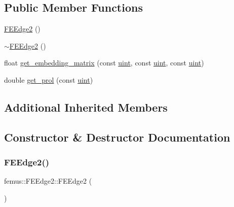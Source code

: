 \subsection*{Public Member Functions}
\begin{DoxyCompactItemize}
\item 
\mbox{\hyperlink{classfemus_1_1_f_e_edge2_a25d45b4be27432a6007312a1da20b799}{F\+E\+Edge2}} ()
\item 
\mbox{\hyperlink{classfemus_1_1_f_e_edge2_ac2e3a2aaafca74f53f4b818a2e17cdcb}{$\sim$\+F\+E\+Edge2}} ()
\item 
float \mbox{\hyperlink{classfemus_1_1_f_e_edge2_ab8a267a26f4930b636d6c5c14d2280dc}{get\+\_\+embedding\+\_\+matrix}} (const \mbox{\hyperlink{_typedefs_8hpp_a91ad9478d81a7aaf2593e8d9c3d06a14}{uint}}, const \mbox{\hyperlink{_typedefs_8hpp_a91ad9478d81a7aaf2593e8d9c3d06a14}{uint}}, const \mbox{\hyperlink{_typedefs_8hpp_a91ad9478d81a7aaf2593e8d9c3d06a14}{uint}})
\item 
double \mbox{\hyperlink{classfemus_1_1_f_e_edge2_a11dc956a09fc9775f474d388eab1de21}{get\+\_\+prol}} (const \mbox{\hyperlink{_typedefs_8hpp_a91ad9478d81a7aaf2593e8d9c3d06a14}{uint}})
\end{DoxyCompactItemize}
\subsection*{Additional Inherited Members}


\subsection{Constructor \& Destructor Documentation}
\mbox{\label{classfemus_1_1_f_e_edge2_a25d45b4be27432a6007312a1da20b799}} 
\subsubsection{\texorpdfstring{F\+E\+Edge2()}{FEEdge2()}}
{\footnotesize\ttfamily femus\+::\+F\+E\+Edge2\+::\+F\+E\+Edge2 (\begin{DoxyParamCaption}{ }\end{DoxyParamCaption})}

\mbox{\label{classfemus_1_1_f_e_edge2_ac2e3a2aaafca74f53f4b818a2e17cdcb}} 
